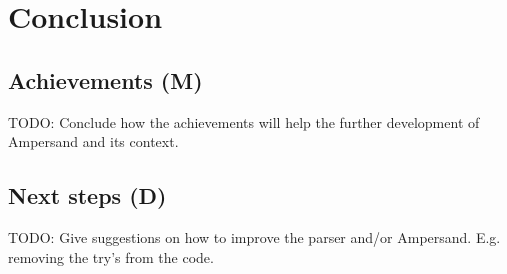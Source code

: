 
\section{Conclusion}
\label{sec:conclusion}

\subsection{Achievements (M)}
TODO: Conclude how the achievements will help the further development of Ampersand and its context.

\subsection{Next steps (D)}
TODO: Give suggestions on how to improve the parser and/or Ampersand. E.g. removing the try's from the code.